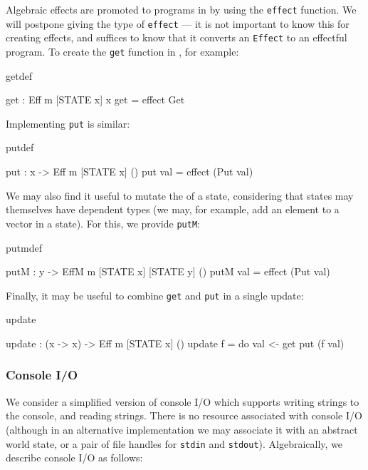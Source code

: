 \noindent
Algebraic effects are promoted to programs in \Eff{} by using the
\texttt{effect} function. We will postpone giving the type of
\texttt{effect} --- it is not important to know this for creating effects,
and suffices to know that it converts an \texttt{Effect} to an effectful
program. To create the \texttt{get} function in \Eff{}, for example:

\begin{SaveVerbatim}{getdef}

get : Eff m [STATE x] x
get = effect Get 

\end{SaveVerbatim}

\noindent
Implementing \texttt{put} is similar:

\begin{SaveVerbatim}{putdef}

put : x -> Eff m [STATE x] ()
put val = effect (Put val)

\end{SaveVerbatim}

\noindent
We may also find it useful to mutate the  of a state, considering
that states may themselves have dependent types (we may, for example, add
an element to a vector in a state). For this, we provide \texttt{putM}:

\begin{SaveVerbatim}{putmdef}

putM : y -> EffM m [STATE x] [STATE y] ()
putM val = effect (Put val)

\end{SaveVerbatim}

\noindent
Finally, it may be useful to combine \texttt{get} and \texttt{put} in a single
update:

\begin{SaveVerbatim}{update}

update : (x -> x) -> Eff m [STATE x] ()
update f = do val <- get
              put (f val) 

\end{SaveVerbatim}

\subsubsection{Console I/O}

We consider a simplified version of console I/O which supports writing strings
to the console, and reading strings. There is no resource associated with
console I/O (although in an alternative implementation we may associate it
with an abstract world state, or a pair of file handles for \texttt{stdin}
and \texttt{stdout}). Algebraically, we describe console I/O as follows:

